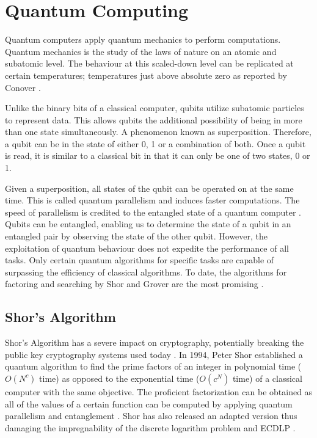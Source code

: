\section{Quantum Computing}
Quantum computers apply quantum mechanics to perform computations. Quantum mechanics is the study of the laws of nature on an atomic and subatomic level. The behaviour at this scaled-down level can be replicated at certain temperatures; temperatures just above absolute zero as reported by Conover \cite{Q_Comp_Real}.

Unlike the binary bits of a classical computer, qubits utilize subatomic particles to represent data. 
This allows qubits the additional possibility of being in more than one state simultaneously.
A phenomenon known as superposition. Therefore, a qubit can be in the state of either 0, 1 or a combination of both. Once a qubit is read, it is similar to a classical bit in that it can only be one of two states, 0 or 1.

Given a superposition, all states of the qubit can be operated on at the same time. This is called quantum parallelism and induces faster computations. The speed of parallelism is credited to the entangled state of a quantum computer \cite{Impact_QC_Cryptog_1}. 
Qubits can be entangled, enabling us to determine the state of a qubit in an entangled pair by observing the state of the other qubit. 
However, the exploitation of quantum behaviour does not expedite the performance of all tasks. Only certain quantum algorithms for specific tasks are capable of surpassing the efficiency of classical algorithms. To date, the algorithms for factoring and searching by Shor and Grover are the most promising \cite{Impact_QC_Cryptog_1}.

\subsection{Shor's Algorithm}
Shor's Algorithm has a severe impact on cryptography, potentially breaking the public key cryptography systems used today \cite{Q_Alg}.
In 1994, Peter Shor established a quantum algorithm to find the prime factors of an integer in polynomial time (\(O(N^c)\) time) as opposed to the exponential time (\(O(c^N)\) time) of a classical computer with the same objective. 
The proficient factorization can be obtained as all of the values of a certain function can be computed by applying quantum parallelism and entanglement \cite{Impact_QC_Cryptog_1}. 
Shor has also released an adapted version thus damaging the impregnability of the discrete logarithm problem and ECDLP \cite{Post_Q_Cryptog}. 

